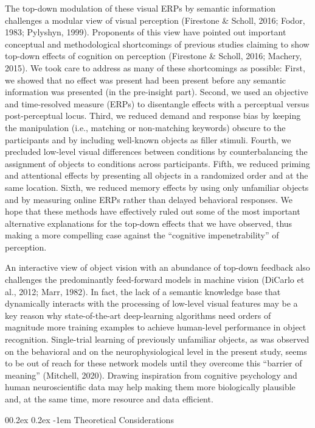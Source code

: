 \documentclass[
  english,
  doc,12pt,twoside,floatsintext]{apa7}
\makeatletter
\let\oldparagraph\paragraph
\renewcommand{\paragraph}[1]{\oldparagraph{#1}\mbox{}}
\renewcommand{\paragraph}{\@startsection{paragraph}{4}{\parindent}%
  {0\baselineskip \@plus 0.2ex \@minus 0.2ex}%
  {-1em}%
  {\normalfont\normalsize\bfseries\itshape\typesectitle}}
\makeatother
\begin{document}
The top-down modulation of these visual ERPs by semantic information challenges a modular view of visual perception (Firestone \& Scholl, 2016; Fodor, 1983; Pylyshyn, 1999). Proponents of this view have pointed out important conceptual and methodological shortcomings of previous studies claiming to show top-down effects of cognition on perception (Firestone \& Scholl, 2016; Machery, 2015). We took care to address as many of these shortcomings as possible: First, we showed that no effect was present had been present before any semantic information was presented (in the pre-insight part). Second, we used an objective and time-resolved measure (ERPs) to disentangle effects with a perceptual versus post-perceptual locus. Third, we reduced demand and response bias by keeping the manipulation (i.e., matching or non-matching keywords) obscure to the participants and by including well-known objects as filler stimuli. Fourth, we precluded low-level visual differences between conditions by counterbalancing the assignment of objects to conditions across participants. Fifth, we reduced priming and attentional effects by presenting all objects in a randomized order and at the same location. Sixth, we reduced memory effects by using only unfamiliar objects and by measuring online ERPs rather than delayed behavioral responses. We hope that these methods have effectively ruled out some of the most important alternative explanations for the top-down effects that we have observed, thus making a more compelling case against the ``cognitive impenetrability'' of perception.

An interactive view of object vision with an abundance of top-down feedback also challenges the predominantly feed-forward models in machine vision (DiCarlo et al., 2012; Marr, 1982). In fact, the lack of a semantic knowledge base that dynamically interacts with the processing of low-level visual features may be a key reason why state-of-the-art deep-learning algorithms need orders of magnitude more training examples to achieve human-level performance in object recognition. Single-trial learning of previously unfamiliar objects, as was observed on the behavioral and on the neurophysiological level in the present study, seems to be out of reach for these network models until they overcome this ``barrier of meaning'' (Mitchell, 2020). Drawing inspiration from cognitive psychology and human neuroscientific data may help making them more biologically plausible and, at the same time, more resource and data efficient.

\hypertarget{theoretical-considerations}{%
\paragraph{Theoretical Considerations}\label{theoretical-considerations}}
\end{document}
